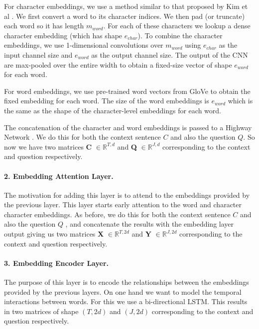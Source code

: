 For character embeddings, we use a method similar to that proposed by Kim et al \cite{kim2016character}. We first convert a word to its character indices. We then pad (or truncate) each word so it has length $m_{word}$.  For each of these characters we lookup a dense character embedding (which has shape ${e_{char}}$). To combine the character embeddings, we use 1-dimensional convolutions over $m_{word}$ using ${e_{char}}$ as the input channel size and ${e_{word}}$ as the output channel size. The output of the CNN are max-pooled over the entire width to obtain a fixed-size vector of shape ${e_{word}}$ for each word. 

For word embeddings, we use pre-trained word vectors from GloVe \cite{pennington2014glove} to obtain the fixed embedding for each word. The size of the word embeddings is ${e_{word}}$ which is the same as the shape of the character-level embeddings for each word.  

The concatenation of the character and word embeddings is passed to a Highway Network \cite{srivastava2015highway}. We do this for both the context sentence $C$ and also the question $Q$. So now we have two matrices \textbf{C} $\in \mathbb{R}^{T, d}$  and \textbf{Q} $\in \mathbb{R}^{J, d}$ corresponding to the context and question respectively.

\paragraph{2. Embedding Attention Layer.} The motivation for adding this layer is to attend to the embeddings provided by the previous layer. This layer starts early attention to the word and character character embeddings. As before, we do this for both the context sentence $C$ and also the question $Q$ , and concatenate the results with the embedding layer output giving us two matrices \textbf{X} $\in \mathbb{R}^{T, 2d}$  and \textbf{Y} $\in \mathbb{R}^{J, 2d}$ corresponding to the context and question respectively. 

\paragraph{3. Embedding Encoder Layer.} The purpose of this layer is to encode the relationships between the embeddings provided by the previous layers. On one hand we want to model the temporal interactions between words. For this we use a bi-directional LSTM. This results in two matrices of shape $(T, 2d)$ and $(J, 2d)$ corresponding to the context and question respectively. 

